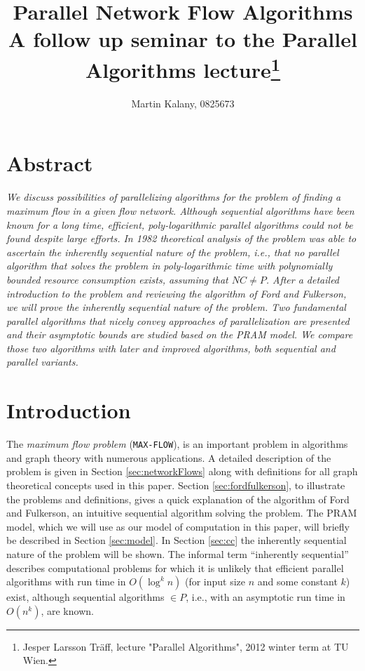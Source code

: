 \documentclass[a4paper,10pt, twocolumn]{article}
\title{Parallel Network Flow Algorithms \\ 
\large A follow up seminar to the Parallel Algorithms lecture\footnote{Jesper Larsson Träff, lecture "Parallel Algorithms", 2012 winter term at TU Wien.}}
\author{Martin Kalany, 0825673}
\begin{document}
\maketitle

\section{Abstract}
\label{sec:abstract}
\textit{We discuss possibilities of parallelizing algorithms for the problem of finding a maximum flow in a given flow network. Although sequential algorithms have been known for a long time, efficient, poly-logarithmic parallel algorithms could not be found despite large efforts. In 1982 theoretical analysis \cite{Goldschlager82} of the problem was able to ascertain the inherently sequential nature of the problem, i.e., that no parallel algorithm that solves the problem in poly-logarithmic time with polynomially bounded resource consumption exists, assuming that $NC \neq P$. After a detailed introduction to the problem and reviewing the algorithm of Ford and Fulkerson, we will prove the inherently sequential nature of the problem. Two fundamental parallel algorithms that nicely convey approaches of parallelization are presented and their asymptotic bounds are studied based on the PRAM model. We compare those two algorithms with later and improved algorithms, both sequential and parallel variants.}


\section{Introduction}
\label{sec:intro}
The \emph{maximum flow problem} (\lstinline|MAX-FLOW|), is an important problem in algorithms and graph theory with numerous applications\cite{ahuja93}. A detailed description of the problem is given in Section \ref{sec:networkFlows} along with definitions for all graph theoretical concepts used in this paper. Section \ref{sec:fordfulkerson}, to illustrate the problems and definitions, gives a quick explanation of the algorithm of Ford and Fulkerson, an intuitive sequential algorithm solving the problem. The PRAM model, which we will use as our model of computation in this paper, will briefly be described in Section \ref{sec:model}. In Section \ref{sec:cc} the inherently sequential nature of the problem will be shown. The informal term ``inherently sequential'' describes computational problems for which it is unlikely that efficient parallel algorithms with run time in $O(\log^{k}n)$ (for input size $n$ and some constant $k$) exist, although sequential algorithms $\in P$, i.e., with an asymptotic run time in $O(n^{k})$, are known.
\end{document}
